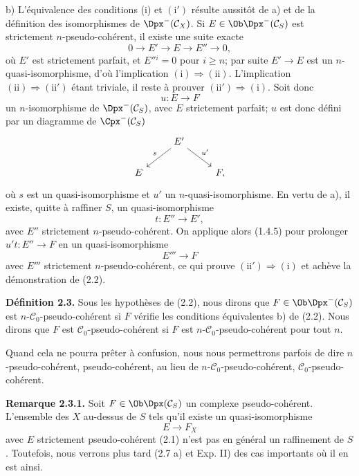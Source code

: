 \documentclass[11pt]{article}
\begin{document}
b) L'équivalence des conditions (i) et \((\mathrm{i}')\) résulte aussitôt de a) et de la définition des isomorphismes de \(\Dpx^-(\mathcal C_X)\). Si \(E\in\Ob\Dpx^-(\mathcal C_S)\) est strictement \(n\)-pseudo-cohérent, il existe une suite exacte
\[
  0\longrightarrow E'\longrightarrow E\longrightarrow E''\longrightarrow 0,
\]
où \(E'\) est strictement parfait, et \(E''{}^i=0\) pour \(i\geq n\); par suite \(E'\to E\) est un \(n\)-quasi-isomorphisme, d'où l'implication \((\mathrm{i})\Rightarrow(\mathrm{ii})\). L'implication \((\mathrm{ii})\Rightarrow(\mathrm{ii}')\) étant triviale, il reste à prouver \((\mathrm{ii}')\Rightarrow(\mathrm{i})\). Soit donc
\[
  u:E\longrightarrow F
\]
un \(n\)-isomorphisme de \(\Dpx^-(\mathcal C_S)\), avec \(E\) strictement parfait; \(u\) est donc défini par un diagramme de \(\Cpx^-(\mathcal C_S)\)
\[
\begin{tikzcd}
& E' \arrow[dl,"s"'] \arrow[dr,"u'"]\\
E && F ,
\end{tikzcd}
\]
où \(s\) est un quasi-isomorphisme et \(u'\) un \(n\)-quasi-isomorphisme. En vertu de a), il existe, quitte à raffiner \(S\), un quasi-isomorphisme
\[
  t:E''\longrightarrow E',
\]
avec \(E''\) strictement \(n\)-pseudo-cohérent. On applique alors (1.4.5) pour prolonger \(u't:E''\to F\) en un quasi-isomorphisme
\[
  E'''\longrightarrow F
\]
avec \(E'''\) strictement \(n\)-pseudo-cohérent, ce qui prouve \((\mathrm{ii}')\Rightarrow(\mathrm{i})\) et achève la démonstration de (2.2).

\textbf{Définition 2.3.} Sous les hypothèses de (2.2), nous dirons que \(F\in\Ob\Dpx^-(\mathcal C_S)\) est \(n\)-\(\mathcal C_0\)-pseudo-cohérent si \(F\) vérifie les conditions équivalentes b) de (2.2). Nous dirons que \(F\) est \(\mathcal C_0\)-pseudo-cohérent si \(F\) est \(n\)-\(\mathcal C_0\)-pseudo-cohérent pour tout \(n\).

Quand cela ne pourra prêter à confusion, nous nous permettrons parfois de dire \(n\)-pseudo-cohérent, pseudo-cohérent, au lieu de \(n\)-\(\mathcal C_0\)-pseudo-cohérent, \(\mathcal C_0\)-pseudo-cohérent.

\textbf{Remarque 2.3.1.} Soit \(F\in\Ob\Dpx(\mathcal C_S)\) un complexe pseudo-cohérent. L'ensemble des \(X\) au-dessus de \(S\) tels qu'il existe un quasi-isomorphisme
\[
  E\longrightarrow F_X
\]
avec \(E\) strictement pseudo-cohérent (2.1) n'est pas en général un raffinement de \(S\). Toutefois, nous verrons plus tard (2.7 a) et Exp. II) des cas importants où il en est ainsi.
\end{document}
